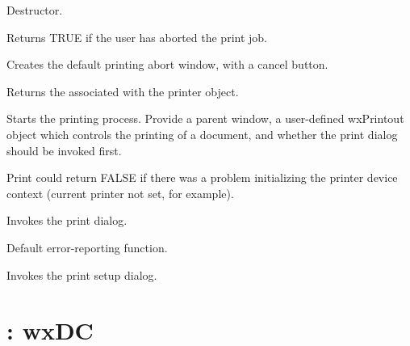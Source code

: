

Destructor.



Returns TRUE if the user has aborted the print job.



Creates the default printing abort window, with a cancel button.



Returns the  associated with the printer object.



Starts the printing process. Provide a parent window, a user-defined wxPrintout object which controls
the printing of a document, and whether the print dialog should be invoked first.

Print could return FALSE if there was a problem initializing the printer device context
(current printer not set, for example).



Invokes the print dialog.



Default error-reporting function.



Invokes the print setup dialog.

\section{: wxDC}\label{wxprinterdc}

